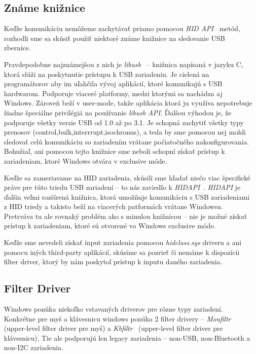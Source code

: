 \subsection*{Známe knižnice}
Keďže komunikáciu nemôžeme zachytávať priamo pomocou \textit{HID API}~\cite{hid_api} metód, rozhodli sme sa skúsiť použiť niektoré známe knižnice na sledovanie USB zbernice. 

Pravdepodobne najznámejšou z nich je \textit{libusb}~\cite{libusb} -- knižnica napísaná v jazyku C, ktorá slúži na poskytnutie prístupu k USB zariadeniu. Je cielená na programátorov aby im uľahčila vývoj aplikácií, ktoré komunikujú s USB hardwarom. Podporuje viaceré platformy, medzi ktorými sa nachádza aj Windows. Zároveň beží v user-mode, takže aplikácia ktorá ju využíva nepotrebuje žiadne špeciálne privilégiá na používanie \textit{libusb API}. Ďalšou výhodou je, že podporuje všetky verzie USB od 1.0 až po 3.1. Je schopná zachytiť všetky typy prenosov (control,bulk,interrrupt,isochronus), a teda by sme pomocou nej mohli sledovať celú komunikáciu so zariadením vrátane počiatočného nakonfigurovania. Bohužiaľ, ani pomocou tejto knižnice sme neboli schopní získať prístup k zariadeniam, ktoré Windows otvára v exclusive móde.

Keďže sa zameriavame na HID zariadenia, skúsili sme hľadať niečo viac špecifické práve pre túto triedu USB zariadení -- to nás zaviedlo k \textit{HIDAPI}~\cite{hidapi_library}. \textit{HIDAPI} je ďalšia veľmi rozšírená knižnica, ktorá umožňuje komunikáciu s USB zariadeniami z HID triedy a takisto beží na viacerých patformách vrátane Windowsu. Pretrváva tu ale rovnaký problém ako s minulou knižnicou -- nie je možné získať prístup k zariadeniam, ktoré sú otvorené vo Windows exclusive móde.

Keďže sme nevedeli získať input zariadenia pomocou \textit{hidclass.sys} driveru a ani pomocu iných third-party aplikácií, skúsime sa pozrieť či nemáme k dispozícii filter driver, ktorý by nám poskytol prístup k inputu daného zariadenia.

\subsection*{Filter Driver}
Windows ponúka niekoľko vstavaných driverov pre rôzne typy zariadení. Konkrétne pre myš a klávesnicu windows ponúka 2 filter drivery -- \textit{Moufiltr}~\cite{moufiltr} (upper-level filter driver pre myš) a \textit{Kbfiltr}~\cite{kbfiltr} (upper-level filter driver pre klávesnicu). Tie ale podporujú len legacy zariadenia -- non-USB, non-Bluetooth a non-I2C zariadenia.

